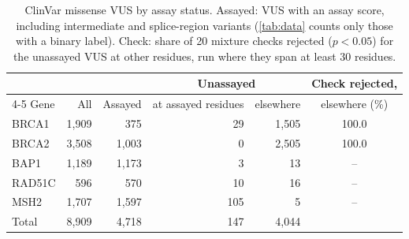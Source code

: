 \begin{table}[ht]
\centering
\caption{ClinVar missense VUS by assay status. Assayed: VUS with an assay score, including intermediate and
splice-region variants (\cref{tab:data} counts only those with a binary label). Check: share of 20 mixture checks
rejected ($p<0.05$) for the unassayed VUS at other residues, run where they span at least 30 residues.}
\label{tab:app_usecase}
\setlength{\tabcolsep}{4pt}
\begin{tabular}{lrrrrc}
\toprule
 & & & \multicolumn{2}{c}{Unassayed} & Check rejected,\\
\cmidrule(lr){4-5}
Gene & All & Assayed & at assayed residues & elsewhere & elsewhere (\%)\\
\midrule
BRCA1 & 1,909 & 375 & 29 & 1,505 & 100.0 \\
BRCA2 & 3,508 & 1,003 & 0 & 2,505 & 100.0 \\
BAP1 & 1,189 & 1,173 & 3 & 13 & -- \\
RAD51C & 596 & 570 & 10 & 16 & -- \\
MSH2 & 1,707 & 1,597 & 105 & 5 & -- \\
\midrule
Total & 8,909 & 4,718 & 147 & 4,044 & \\
\bottomrule
\end{tabular}
\end{table}
